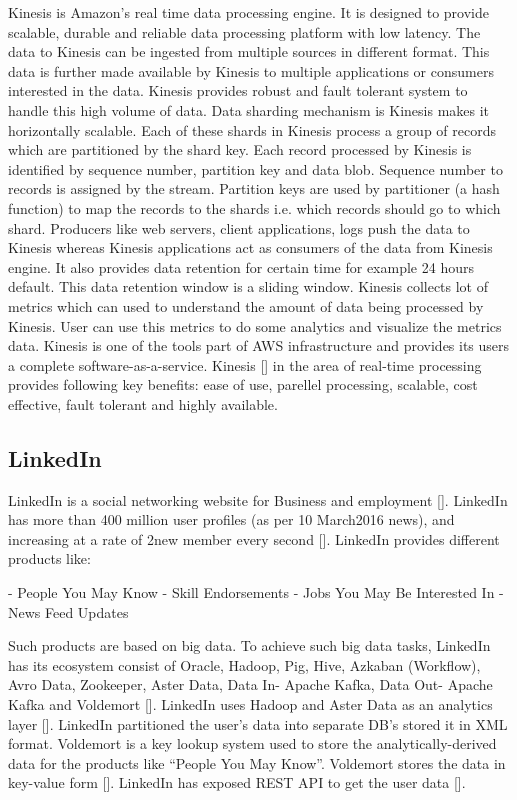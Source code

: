Kinesis is Amazon's real time data processing engine. It is designed
to provide scalable, durable and reliable data processing platform
with low latency\cite{www-kinesis}.  The data to Kinesis can be
ingested from multiple sources in different format. This data is
further made available by Kinesis to multiple applications or
consumers interested in the data. Kinesis provides robust and fault
tolerant system to handle this high volume of data. Data sharding
mechanism is Kinesis makes it horizontally scalable. Each of these
shards in Kinesis process a group of records which are partitioned by
the shard key. Each record processed by Kinesis is identified by
sequence number, partition key and data blob. Sequence number to
records is assigned by the stream. Partition keys are used by
partitioner (a hash function) to map the records to the shards
i.e. which records should go to which shard. Producers like web
servers, client applications, logs push the data to Kinesis whereas
Kinesis applications act as consumers of the data from Kinesis
engine. It also provides data retention for certain time for example
24 hours default. This data retention window is a sliding
window. Kinesis collects lot of metrics which can used to understand
the amount of data being processed by Kinesis.  User can use this
metrics to do some analytics and visualize the metrics data.  Kinesis
is one of the tools part of AWS infrastructure and provides its users
a complete
software-as-a-service. Kinesis [\cite{big-data-analytics-book}] in the
area of real-time processing provides following key benefits: ease of
use, parellel processing, scalable, cost effective, fault tolerant and
highly available.



\subsection{LinkedIn}
     
LinkedIn is a social networking website for Business and
employment [\cite{www-linkedinwiki}]. LinkedIn has more than 400 million
user profiles (as per 10 March2016 news), and increasing at a rate of
2new member every second [\cite{www-linkedinbigdata}].  LinkedIn
provides different products like:

- People You May Know
- Skill Endorsements
- Jobs You May Be Interested In
- News Feed Updates

Such products are based on big data. To achieve such big data tasks,
LinkedIn has its ecosystem consist of Oracle, Hadoop, Pig, Hive,
Azkaban (Workflow), Avro Data, Zookeeper, Aster Data, Data In- Apache
Kafka, Data Out- Apache Kafka and Voldemort
[\cite{www-linkedinbigdata}]. LinkedIn uses Hadoop and Aster Data as
an analytics layer [\cite{www-linkedinquora}]. LinkedIn partitioned
the user's data into separate DB's stored it in XML format. Voldemort
is a key lookup system used to store the analytically-derived data for
the products like ``People You May Know''. Voldemort stores the data
in key-value form [\cite{www-linkedinquora}]. LinkedIn has exposed
REST API to get the user data [\cite{www-linkedindevelopers}].

